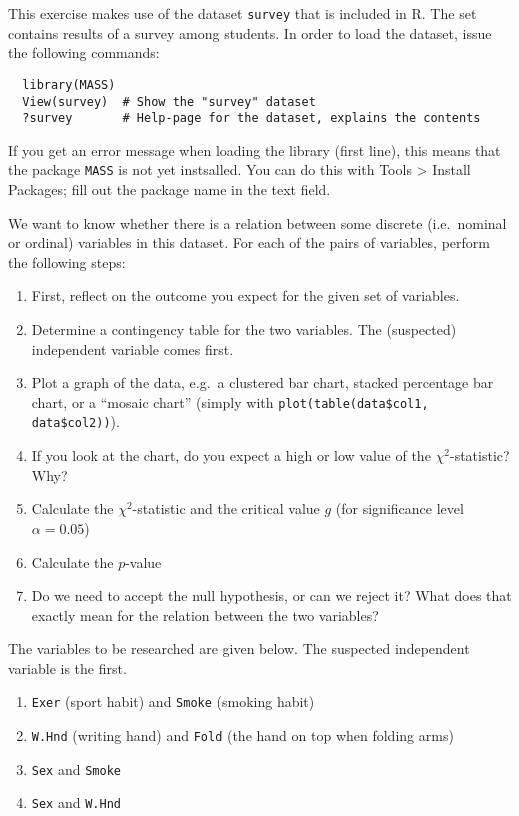 \begin{exercise}
  \label{ex:chisq-survey}
  This exercise makes use of the dataset \texttt{survey} that is included in R. The set contains results of a survey among students. In order to load the dataset, issue the following commands:
  
  \begin{lstlisting}
  library(MASS)
  View(survey)  # Show the "survey" dataset
  ?survey       # Help-page for the dataset, explains the contents
  \end{lstlisting}
  
  If you get an error message when loading the library (first line), this means that the package \texttt{MASS} is not yet instsalled. You can do this with Tools > Install Packages; fill out the package name in the text field.
  
  We want to know whether there is a relation between some discrete (i.e.~nominal or ordinal) variables in this dataset. For each of the pairs of variables, perform the following steps:
  
\begin{enumerate}[label=(\alph*)]
    \item First, reflect on the outcome you expect for the given set of variables.
    \item Determine a contingency table for the two variables. The (suspected) independent variable comes first.
    \item Plot a graph of the data, e.g.~a clustered bar chart, stacked percentage bar chart, or a ``mosaic chart'' (simply with \texttt{plot(table(data\$col1, data\$col2))}).
    \item If you look at the chart, do you expect a high or low value of the $\chi^2$-statistic? Why?
    \item Calculate the $\chi^2$-statistic and the critical value $g$ (for significance level $\alpha = 0.05$)
    \item Calculate the $p$-value
    \item Do we need to accept the null hypothesis, or can we reject it? What does that exactly mean for the relation between the two variables?
  \end{enumerate}
  
  The variables to be researched are given below. The suspected independent variable is the first.
  
  \begin{enumerate}
    \item \texttt{Exer} (sport habit) and \texttt{Smoke} (smoking habit)
    \item \texttt{W.Hnd} (writing hand) and \texttt{Fold} (the hand on top when folding arms)
    \item \texttt{Sex} and \texttt{Smoke}
    \item \texttt{Sex} and \texttt{W.Hnd}
  \end{enumerate}
\end{exercise}

